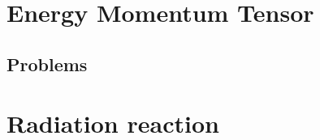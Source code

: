    \chapter{Energy Momentum Tensor}
      
      
      
      \section{Problems}
         
         
         
         
         
         

   \chapter{Radiation reaction}
      
      
      
      


